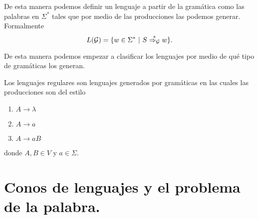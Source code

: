 \documentclass[tesis.tex]{subfiles}
\begin{document}
De esta manera podemos definir un lenguaje a partir de la gramática como las palabras en $\Sigma^*$ tales que por medio de las producciones las podemos generar. Formalmente
\[
L({\cal G}) = \{ w \in \Sigma^* \ | \ S \overset{*}{\Rightarrow_{\cal G}} w   \}.
\]

De esta manera podemos empezar a clasificar los lenguajes por medio de qué tipo de gramáticas los generan. 

\begin{deff}
	Los lenguajes regulares son lenguajes generados por gramáticas en las cuales las producciones son del estilo
	\begin{enumerate}
		\item $A \to \lambda$
		\item $A \to a$
		\item $A \to a B$
	\end{enumerate}
	donde $A, B \in V$ y $a \in \Sigma$.
\end{deff}


\begin{comment}
	\begin{deff}
	Un automáta finito es una tupla ${\cal M} = (Q,\{q_0\},\Sigma,\delta,F)$ que la interpretamos de la siguiente manera:
	\begin{itemize}
	\item $Q$ son los estados.
	\item $q_0$ es el estado inicial.
	\item $\Sigma$ es el alfabeto.
	\item $\Delta$ es la función de transición entre los estados.
	\item $F$ es un conjunto de estados que llamaremos finales.
	\end{itemize}
	\end{deff}
	
	A los automátas finitos los interpretamos como grafos con algunas reglas para movernos sobre ellos. Para empezar $Q$ representan los vértices de nuestro grafo.
\end{comment}







\section{Conos de lenguajes y el problema de la palabra.}
\end{document}
